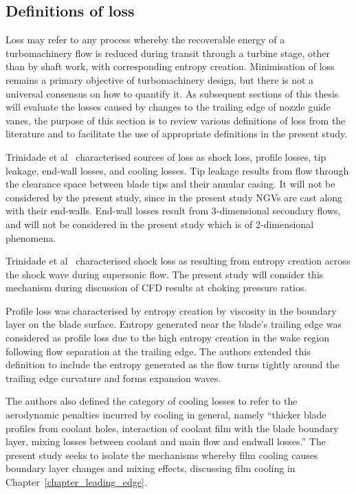\documentclass[a4paper, 11pt, oneside]{report}
\begin{document}
\subsection{Definitions of loss}

Loss may refer to any process whereby the recoverable energy of a turbomachinery flow is reduced during transit through a turbine stage, other than by shaft work, with corresponding entropy creation. Minimisation of loss remains a primary objective of turbomachinery design, but there is not a universal consensus on how to quantify it. As subsequent sections of this thesis will evaluate the losses caused by changes to the trailing edge of nozzle guide vanes, the purpose of this section is to review various definitions of loss from the literature and to facilitate the use of appropriate definitions in the present study.

Trinidade et al~\cite{trinidade_loss} characterised sources of loss as shock loss, profile losses, tip leakage, end-wall losses, and cooling losses. Tip leakage results from flow through the clearance space between blade tips and their annular casing. It will not be considered by the present study, since in the present study NGVs are cast along with their end-walls. End-wall losses result from 3-dimensional secondary flows, and will not be considered in the present study which is of 2-dimensional phenomena.

Trinidade et al~\cite{trinidade_loss} characterised shock loss as resulting from entropy creation across the shock wave during supersonic flow. The present study will consider this mechanism during discussion of CFD results at choking pressure ratios.

Profile loss was characterised by entropy creation by viscosity in the boundary layer on the blade surface. Entropy generated near the blade's trailing edge was considered as profile loss due to the high entropy creation in the wake region following flow separation at the trailing edge. The authors extended this definition to include the entropy generated as the flow turns tightly around the trailing edge curvature and forms expansion waves.

The authors also defined the category of cooling losses to refer to the aerodynamic penalties incurred by cooling in general, namely ``thicker blade profiles from coolant holes, interaction of coolant film with the blade boundary layer, mixing losses between coolant and main flow and endwall losses.'' The present study seeks to isolate the mechanisms whereby film cooling causes boundary layer changes and mixing effects, discussing film cooling in Chapter~\ref{chapter_leading_edge}.
\end{document}

